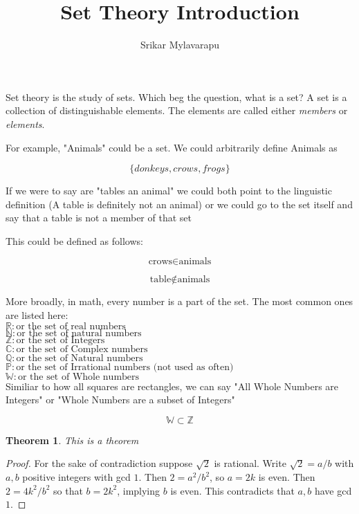 \documentclass[12pt]{article}
\author{Srikar Mylavarapu}
\title{Set Theory Introduction}
\newtheorem{theorem}{Theorem}
\begin{document}
\maketitle

Set theory is the study of sets. Which beg the question, what is a set? A set is a collection of distinguishable elements. The elements are called either \emph{members} or \emph{elements}. 

For example, "Animals" could be a set. We could arbitrarily define Animals as

$$\{donkeys, crows, frogs\}$$

If we were to say are "tables an animal" we could both point to the linguistic definition (A table is definitely not an animal) or we could go to the set itself and say that a table is not a member of that set

This could be defined as follows:

$$\textrm{crows} \in \textrm{animals} $$

$$\textrm{table} \notin \textrm{animals} $$

More broadly, in math, every number is a part of the set. The most common ones are listed here:
\\
$ \mathbb{R} \colon \textrm{or the set of real numbers}$
\\
$ \mathbb{N} \colon \textrm{or the set of natural numbers}$
\\
$ \mathbb{Z} \colon \textrm{or the set of Integers}$
\\
$ \mathbb{C} \colon \textrm{or the set of Complex numbers}$
\\
$ \mathbb{Q} \colon \textrm{or the set of Natural numbers}$
\\
$ \mathbb{P} \colon \textrm{or the set of Irrational numbers (not used as often)}$
\\
$ \mathbb{W} \colon \textrm{or the set of Whole numbers}$
\\

Similiar to how all squares are rectangles, we can say "All Whole Numbers are Integers" or "Whole Numbers are a subset of Integers"

$$\mathbb{W}\subset\mathbb{Z}$$
\begin{theorem}
  This is a theorem
\end{theorem}


\begin{proof}
For the sake of contradiction suppose $\sqrt{2}$ is rational. Write $\sqrt{2} = a/b$ with $a,b$ positive integers with gcd $1$. Then $2 = a^2/b^2$, so $a = 2k$ is even. Then $2 = 4k^2/b^2$ so that $b = 2k^2$, implying $b$ is even. This contradicts that $a,b$ have gcd $1$.
\end{proof}
\end{document}
